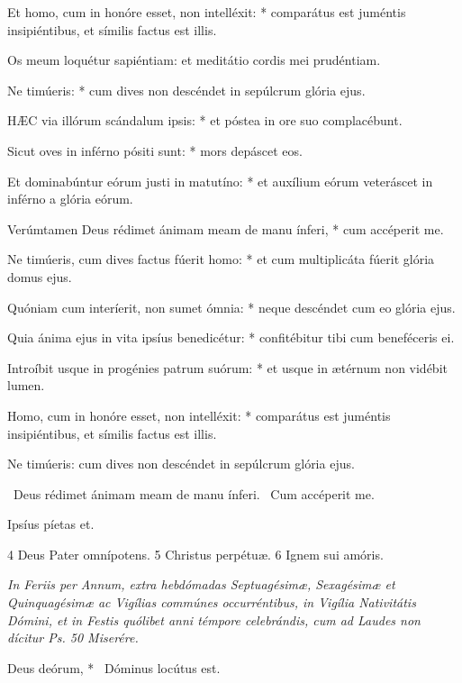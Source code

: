 Et homo, cum in honóre esset, non intelléxit: * comparátus est juméntis insipiéntibus, et símilis factus est illis.

 Os meum loquétur sapiéntiam: et meditátio cordis mei prudéntiam.

 Ne timúeris: * cum dives non descéndet in sepúlcrum glória ejus.


\lettrine[lines=2]{H}{ÆC} via illórum scándalum ipsis: * et póstea in ore suo complacébunt.

Sicut oves in inférno pósiti sunt: * mors depáscet eos.

Et dominabúntur eórum justi in matutíno: * et auxílium eórum veteráscet in inférno a glória eórum.

Verúmtamen Deus rédimet ánimam meam de manu ínferi, * cum accéperit me.

Ne timúeris, cum dives factus fúerit homo: * et cum multiplicáta fúerit glória domus ejus.

Quóniam cum interíerit, non sumet ómnia: * neque descéndet cum eo glória ejus.

Quia ánima ejus in vita ipsíus benedicétur: * confitébitur tibi cum beneféceris ei.

Introíbit usque in progénies patrum suórum: * et usque in ætérnum non vidébit lumen.

Homo, cum in honóre esset, non intelléxit: * comparátus est juméntis insipiéntibus, et símilis factus est illis.

 Ne timúeris: cum dives non descéndet in sepúlcrum glória ejus.


\V\ Deus rédimet ánimam meam de manu ínferi. \R\ Cum accéperit me.

 Ipsíus píetas et.

 4 Deus Pater omnípotens. 5 Christus perpétuæ. 6 Ignem sui amóris.



\textit{In Feriis per Annum, extra hebdómadas Septuagésimæ, Sexagésimæ et Quinquagésimæ ac Vigílias commúnes occurréntibus, in Vigília Nativitátis Dómini, et in Festis quólibet anni témpore celebrándis, cum ad Laudes non dícitur Ps. 50 Miserére.}

 Deus deórum, * \textdagger\ Dóminus locútus est. \textdaggerdbl

